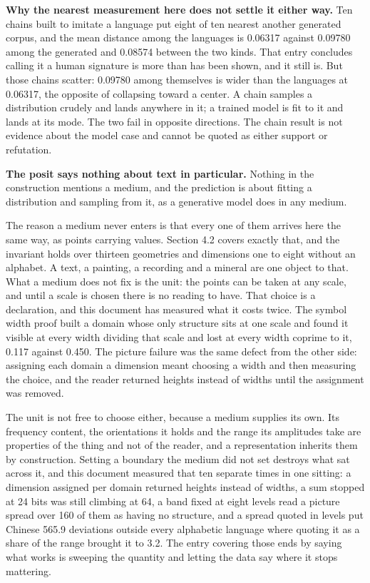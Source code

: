 \textbf{Why the nearest measurement here does not settle it either way.} Ten chains built to imitate a language put eight of ten nearest another generated corpus, and the mean distance among the languages is 0.06317 against 0.09780 among the generated and 0.08574 between the two kinds. That entry concludes calling it a human signature is more than has been shown, and it still is. But those chains scatter: 0.09780 among themselves is wider than the languages at 0.06317, the opposite of collapsing toward a center. A chain samples a distribution crudely and lands anywhere in it; a trained model is fit to it and lands at its mode. The two fail in opposite directions. The chain result is not evidence about the model case and cannot be quoted as either support or refutation.

\textbf{The posit says nothing about text in particular.} Nothing in the construction mentions a medium, and the prediction is about fitting a distribution and sampling from it, as a generative model does in any medium.

The reason a medium never enters is that every one of them arrives here the same way, as points carrying values. Section 4.2 covers exactly that, and the invariant holds over thirteen geometries and dimensions one to eight without an alphabet. A text, a painting, a recording and a mineral are one object to that. What a medium does not fix is the unit: the points can be taken at any scale, and until a scale is chosen there is no reading to have. That choice is a declaration, and this document has measured what it costs twice. The symbol width proof built a domain whose only structure sits at one scale and found it visible at every width dividing that scale and lost at every width coprime to it, 0.117 against 0.450. The picture failure was the same defect from the other side: assigning each domain a dimension meant choosing a width and then measuring the choice, and the reader returned heights instead of widths until the assignment was removed.

The unit is not free to choose either, because a medium supplies its own. Its frequency content, the orientations it holds and the range its amplitudes take are properties of the thing and not of the reader, and a representation inherits them by construction. Setting a boundary the medium did not set destroys what sat across it, and this document measured that ten separate times in one sitting: a dimension assigned per domain returned heights instead of widths, a sum stopped at 24 bits was still climbing at 64, a band fixed at eight levels read a picture spread over 160 of them as having no structure, and a spread quoted in levels put Chinese 565.9 deviations outside every alphabetic language where quoting it as a share of the range brought it to 3.2. The entry covering those ends by saying what works is sweeping the quantity and letting the data say where it stops mattering.

